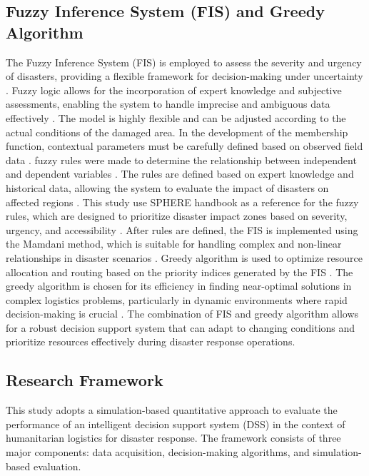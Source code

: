 \documentclass[journal,final,a4paper,twoside,11pt]{IEEEtran}
\begin{document}
\subsection{Fuzzy Inference System (FIS) and Greedy Algorithm}
The Fuzzy Inference System (FIS) is employed to assess the severity and urgency of disasters, providing a flexible framework for decision-making under uncertainty \cite{berawi2020prioritized}. Fuzzy logic allows for the incorporation of expert knowledge and subjective assessments, enabling the system to handle imprecise and ambiguous data effectively \cite{jain2020membership}. The model is highly flexible and can be adjusted according to the actual conditions of the damaged area. In the development of the membership function, contextual parameters must be carefully defined based on observed field data \cite{amiri2021application}. fuzzy rules were made to determine the relationship between independent and dependent variables \cite{yoon2023novel}. The rules are defined based on expert knowledge and historical data, allowing the system to evaluate the impact of disasters on affected regions \cite{wang2024gis}. This study use SPHERE handbook as a reference for the fuzzy rules, which are designed to prioritize disaster impact zones based on severity, urgency, and accessibility \cite{sphere2018pdf}. After rules are defined, the FIS is implemented using the Mamdani method, which is suitable for handling complex and non-linear relationships in disaster scenarios \cite{herpratiwi2022implementation}. Greedy algorithm is used to optimize resource allocation and routing based on the priority indices generated by the FIS \cite{shirmarz2020adaptive}. The greedy algorithm is chosen for its efficiency in finding near-optimal solutions in complex logistics problems, particularly in dynamic environments where rapid decision-making is crucial \cite{hamidouglu2023game}. The combination of FIS and greedy algorithm allows for a robust decision support system that can adapt to changing conditions and prioritize resources effectively during disaster response operations. 
 

\subsection{Research Framework}

This study adopts a simulation-based quantitative approach to evaluate the performance of an intelligent decision support system (DSS) in the context of humanitarian logistics for disaster response. The framework consists of three major components: data acquisition, decision-making algorithms, and simulation-based evaluation.
\end{document}
